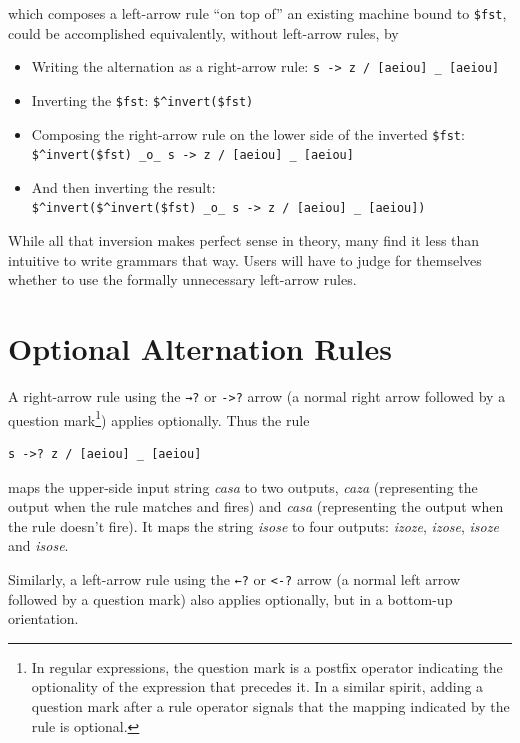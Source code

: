 \noindent
which composes a left-arrow rule ``on top of'' an existing machine bound to \verb!$fst!,
could be accomplished equivalently, without left-arrow rules, by 

\begin{itemize}
\item
Writing the alternation as a right-arrow rule:  \verb!s -> z / [aeiou] _ [aeiou]!
\item
Inverting the \verb!$fst!:  \verb!$^invert($fst)!
\item
Composing the right-arrow rule on the lower side of the inverted \verb!$fst!:
\verb!$^invert($fst) _o_ s -> z / [aeiou] _ [aeiou]!
\item
And then inverting the result:\\ 
\verb!$^invert($^invert($fst) _o_ s -> z / [aeiou] _ [aeiou])!
\end{itemize}


\noindent 
While all that inversion makes perfect sense in theory, many find it less than intuitive to write grammars that way.
Users will have to judge for themselves whether to use
the formally unnecessary left-arrow rules.

\section{Optional Alternation Rules}

A right-arrow rule using the \texttt{→?} or \texttt{->?} arrow (a normal right arrow followed by a question
mark\footnote{In regular expressions, the question mark is a postfix operator indicating the optionality of the expression that
precedes it.  In a similar spirit, adding a question mark after a rule operator signals that the mapping indicated by the rule is
optional.}) applies optionally.  Thus
the rule

\begin{Verbatim}
s ->? z / [aeiou] _ [aeiou]
\end{Verbatim}

\noindent
maps the upper-side input string \emph{casa} to two outputs, \emph{caza} (representing the output when
the rule matches and fires) and
\emph{casa} (representing the output when the rule doesn't fire).  It 
maps the string \emph{isose} to four outputs:
\emph{izoze}, \emph{izose}, \emph{isoze} and \emph{isose}.

Similarly, a left-arrow rule using the \texttt{←?} or \texttt{<-?} arrow (a normal left arrow followed by a question mark) also
applies optionally, but in a bottom-up orientation.

